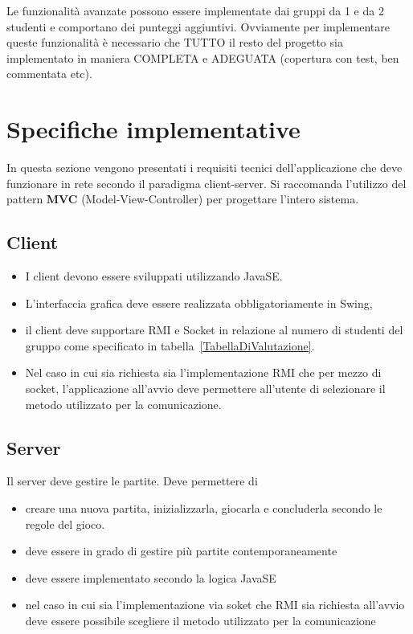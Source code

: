 \documentclass{article}
\begin{document}
Le funzionalit\`a avanzate possono essere implementate dai gruppi da 1 e da 2 studenti e comportano dei punteggi aggiuntivi. Ovviamente per implementare queste funzionalit\`a \`e necessario che TUTTO il resto del progetto sia implementato in maniera COMPLETA e ADEGUATA (copertura con test, ben commentata etc).


\section{Specifiche implementative}

In questa sezione vengono presentati i requisiti tecnici dell'applicazione che deve funzionare in rete secondo il paradigma client-server. Si raccomanda l'utilizzo del pattern \textbf{MVC} (Model-View-Controller) per progettare l'intero sistema.


\subsection{Client}
\begin{itemize}
\item I client devono essere sviluppati utilizzando JavaSE. 
\item L'interfaccia grafica deve essere realizzata obbligatoriamente in Swing, 
\item il client deve supportare RMI e Socket in relazione al numero di studenti del gruppo come specificato in tabella~\ref{TabellaDiValutazione}. 
\item Nel caso in cui sia richiesta sia l'implementazione RMI che per mezzo di socket, l'applicazione all'avvio deve permettere all'utente di selezionare il metodo utilizzato per la comunicazione.
\end{itemize}

\subsection{Server}
Il server deve gestire le partite. Deve permettere di 
\begin{itemize}
\item creare una nuova partita, inizializzarla, giocarla e concluderla secondo le regole del gioco.
\item deve essere in grado di gestire pi\`u partite contemporaneamente
\item deve essere implementato secondo la logica JavaSE
\item nel caso in cui sia l'implementazione via soket che RMI sia richiesta all'avvio deve essere possibile scegliere il metodo utilizzato per la comunicazione
\end{itemize}
\end{document}
